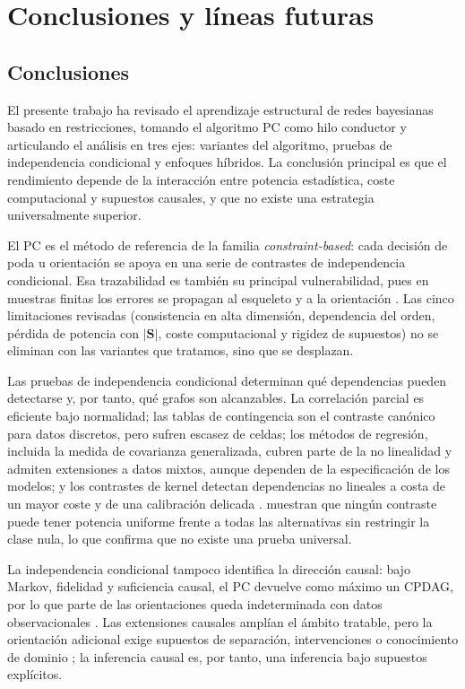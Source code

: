 \section{Conclusiones y líneas futuras}
\subsection{Conclusiones}

El presente trabajo ha revisado el aprendizaje estructural de redes bayesianas basado en
restricciones, tomando el algoritmo PC como hilo conductor y articulando el análisis en
tres ejes: variantes del algoritmo, pruebas de independencia condicional y enfoques
híbridos. La conclusión principal es que el rendimiento depende de la interacción entre
potencia estadística, coste computacional y supuestos causales, y que no existe una
estrategia universalmente superior.

El PC es el método de referencia de la familia \emph{constraint-based}: cada decisión de
poda u orientación se apoya en una serie de contrastes de independencia condicional. Esa
trazabilidad es también su principal vulnerabilidad, pues en muestras finitas los errores
se propagan al esqueleto y a la orientación \citep{spirtes2000causation, colombo2014order}.
Las cinco limitaciones revisadas (consistencia en alta dimensión, dependencia del orden,
pérdida de potencia con $|\mathbf{S}|$, coste computacional y rigidez de supuestos) no se
eliminan con las variantes que tratamos, sino que se desplazan.

Las pruebas de independencia condicional determinan qué dependencias pueden detectarse y,
por tanto, qué grafos son alcanzables. La correlación parcial es eficiente bajo normalidad;
las tablas de contingencia son el contraste canónico para datos discretos, pero sufren
escasez de celdas; los métodos de regresión, incluida la medida de covarianza generalizada,
cubren parte de la no linealidad y admiten extensiones a datos mixtos, aunque dependen de la
especificación de los modelos; y los
contrastes de kernel detectan dependencias no lineales a costa de un mayor coste y de una
calibración delicada \citep{shah2020gcm, zhang2011kci, runge2018conditional,
strobl2019approximate}. \citet{shah2020gcm} muestran que ningún contraste puede tener
potencia uniforme frente a todas las alternativas sin restringir la clase nula, lo que
confirma que no existe una prueba universal.

La independencia condicional tampoco identifica la dirección causal: bajo Markov, fidelidad
y suficiencia causal, el PC devuelve como máximo un CPDAG, por lo que parte de las
orientaciones queda indeterminada con datos observacionales \citep{spirtes2000causation}. Las extensiones
causales amplían el ámbito tratable, pero la orientación adicional exige supuestos de
separación, intervenciones o conocimiento de dominio
\citep{richardson2002ancestral, triantafillou2015constraint, mooij2020constraint}; la
inferencia causal es, por tanto, una inferencia bajo supuestos explícitos.


